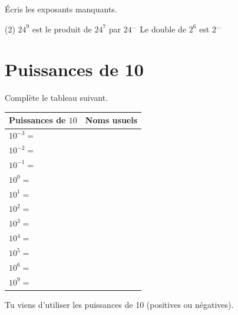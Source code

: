 \documentclass[../math2.tex]{subfiles}
\begin{document}

\begin{exercise}
	Écris les exposants manquants.
	\begin{tasks}(2)
		\task $24^9$ est le produit de $24^7$ par $24^{\dots}$
		\task Le double de $2^6$ est $2^{\dots}$
	\end{tasks}
\end{exercise}

\newpage
\section{Puissances de 10}

Complète le tableau suivant.

	{\renewcommand{\arraystretch}{1.5}
		\begin{tabularx}{\linewidth}{|X|X|}
			\hline
			\centering \textbf{Puissances de $10$} & \centering\arraybackslash \textbf{Noms usuels} \\\hline
			$10^{-3} = $                           &                                                \\\hline
			$10^{-2} = $                           &                                                \\\hline
			$10^{-1} = $                           &                                                \\\hline
			$10^0 = $                              &                                                \\\hline
			$10^1 = $                              &                                                \\\hline
			$10^2 = $                              &                                                \\\hline
			$10^3 = $                              &                                                \\\hline
			$10^4 = $                              &                                                \\\hline
			$10^5 = $                              &                                                \\\hline
			$10^6 = $                              &                                                \\\hline
			$10^9 = $                              &                                                \\\hline
		\end{tabularx}}
\bigbreak
Tu viens d'utiliser les puissances de 10 (positives ou négatives).
\end{document}
